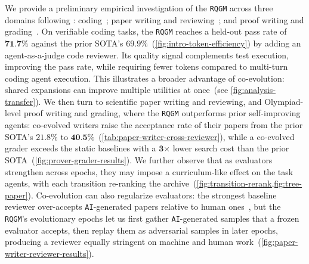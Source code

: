 \documentclass{paper}
\newcommand{\ourmethod}{\texttt{RQGM}\xspace}
\newcommand{\theourmethod}{the \ourmethod}
\newcommand{\AI}{\texttt{AI}}
\begin{document}
We provide a preliminary empirical investigation of \theourmethod across three domains following \citet{zhang2026hyperagents}: coding~\citep{gauthier2024polyglot}; paper writing and reviewing~\citep{lu2024ai,zhao2026apres}; and proof writing and grading~\citep{zhang2026hyperagents,luong2025towards}. On verifiable coding tasks, \theourmethod reaches a held-out pass rate of $\textbf{71.7}\boldsymbol{\%}$ against the prior SOTA's $69.9\boldsymbol{\%}$~(\cref{fig:intro-token-efficiency}) by adding an agent-as-a-judge code reviewer. Its quality signal complements test execution, improving the pass rate, while requiring fewer tokens compared to multi-turn coding agent execution. This illustrates a broader advantage of co-evolution: shared expansions can improve multiple utilities at once~(see \cref{fig:analysis-transfer}). We then turn to scientific paper writing and reviewing, and Olympiad-level proof writing and grading, where \theourmethod outperforms prior self-improving agents: co-evolved writers raise the acceptance rate of their papers from the prior SOTA's $21.8\boldsymbol{\%}$ to $\textbf{40.5}\boldsymbol{\%}$~(\cref{tab:paper-writer-cross-reviewer}), while a co-evolved grader exceeds the static baselines with a $\textbf{3}\boldsymbol{\times}$ lower search cost than the prior SOTA~(\cref{fig:prover-grader-results}). We further observe that as evaluators strengthen across epochs, they may impose a curriculum-like effect on the task agents, with each transition re-ranking the archive~(\cref{fig:transition-rerank,fig:tree-paper}). Co-evolution can also regularize evaluators: the strongest baseline reviewer over-accepts \AI-generated papers relative to human ones~\citep{DBLP:conf/nips/PanicksseryBF24}, but \theourmethod's evolutionary epochs let us first gather \AI-generated samples that a frozen evaluator accepts, then replay them as adversarial samples in later epochs, producing a reviewer equally stringent on machine and human work~(\cref{fig:paper-writer-reviewer-results}).
\end{document}
